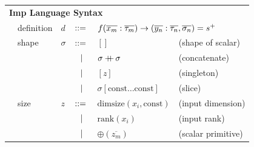 \documentclass[preprint]{sigplanconf}
\begin{document}
\begin{tabular}{m{0.1cm}m{1.2cm}m{0.1cm}m{0.2cm}p{2cm}p{2.7cm}}
 \multicolumn{6}{l}{\textbf{Imp Language Syntax}} \\[4pt]
& definition        & $d$      & $::=$ & 
      \multicolumn{2}{l}{$f(\overline{x_m} : \overline{\tau_m}) \rightarrow (\overline{y_n} : \overline{\tau_n}, \overline{\sigma_n}) = s^{\small{+}}$} \\[4pt]
& shape             & $\sigma$ & $::=$ & $ [] $                                            &  \quad \small{(shape of scalar)}      \\[2pt]
&                   &          & $\ \ | \ \ $    & $ \sigma +\!\!\!\!+\, \sigma $                         &  \quad \small{(concatenate)}      \\[2pt]
&                   &          & $\ \ | \ \ $    & $ [z] $                                           &  \quad \small{(singleton)}   \\[2pt]
&                   &          & $\ \ | \ \ $    & $ \sigma[\mathrm{const} \ldots  \mathrm{const}] $ &  \quad \small{(slice)}       \\[4pt]
& size              & $z$      & $::=$ & $ \mathrm{dimsize}(x_i, \mathrm{const}) $         &  \quad \small{(input dimension)}   \\[2pt]
&                   &          & $\ \ | \ \ $    & $ \mathrm{rank}(x_i) $                            &  \quad \small{(input rank)}  \\[2pt]
&                   &          & $\ \ | \ \ $    & $ \oplus(\overline{z_m})$                         &  \quad \small{(scalar primitive)}    \\[2pt]
\end{tabular}
\end{document}

